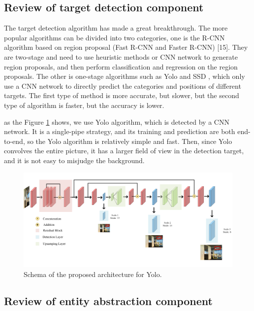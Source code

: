 \subsection{Review of target detection component}
The target detection algorithm has made a great breakthrough. The more popular algorithms can be divided into two categories, one is the R-CNN algorithm based on region proposal (Fast R-CNN and Faster R-CNN) [15]. They are two-stage and need to use heuristic methods or CNN network to generate region proposals, and then perform classification and regression on the region proposals. The other is one-stage algorithms such as Yolo and SSD , which only use a CNN network to directly predict the categories and positions of different targets. The first type of method is more accurate, but slower, but the second type of algorithm is faster, but the accuracy is lower.
	
as the Figure \ref{image04} shows, we use Yolo algorithm, which is detected by a CNN network. It is a single-pipe strategy, and its training and prediction are both end-to-end, so the Yolo algorithm is relatively simple and fast. Then, since Yolo convolves the entire picture, it has a larger field of view in the detection target, and it is not easy to misjudge the background.

\begin{figure}
	\centering
	\includegraphics[scale=1]{image04.png}
	\caption{Schema of the proposed architecture for Yolo.}
	\label{image04}
\end{figure}

\subsection{Review of entity abstraction component}
	

